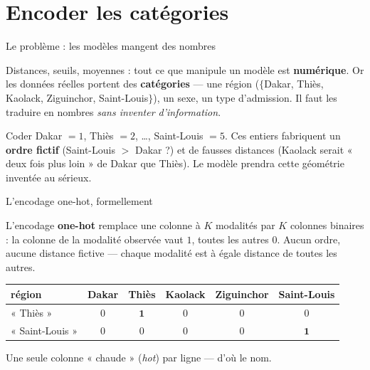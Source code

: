 \documentclass[aspectratio=169,11pt]{beamer}
\begin{document}
\section{Encoder les catégories}

\begin{frame}{Le problème : les modèles mangent des nombres}
\begin{ucaddef}[Le constat]
{\small Distances, seuils, moyennes : tout ce que manipule un modèle est \textbf{numérique}. Or les données réelles portent des \textbf{catégories} — une région ($\{$Dakar, Thiès, Kaolack, Ziguinchor, Saint-Louis$\}$), un sexe, un type d'admission. Il faut les traduire en nombres \emph{sans inventer d'information}.}
\end{ucaddef}
\begin{ucadpiege}
{\small Coder Dakar $=1$, Thiès $=2$, \dots, Saint-Louis $=5$. Ces entiers fabriquent un \textbf{ordre fictif} (Saint-Louis $>$ Dakar ?) et de fausses distances (Kaolack serait « deux fois plus loin » de Dakar que Thiès). Le modèle prendra cette géométrie inventée au sérieux.}
\end{ucadpiege}
\end{frame}

\begin{frame}{L'encodage one-hot, formellement}
\begin{ucaddef}[Définition]
{\small L'encodage \textbf{one-hot} remplace une colonne à $K$ modalités par $K$ colonnes binaires : la colonne de la modalité observée vaut $1$, toutes les autres $0$. Aucun ordre, aucune distance fictive — chaque modalité est à égale distance de toutes les autres.}
\end{ucaddef}
\begin{ucadex}
{\small \begin{center}\begin{tabular}{l|ccccc}
région & Dakar & Thiès & Kaolack & Ziguinchor & Saint-Louis\\\hline
« Thiès » & $0$ & $\mathbf{1}$ & $0$ & $0$ & $0$\\
« Saint-Louis » & $0$ & $0$ & $0$ & $0$ & $\mathbf{1}$\\
\end{tabular}\end{center}
Une seule colonne « chaude » (\emph{hot}) par ligne — d'où le nom.}
\end{ucadex}
\end{frame}
\end{document}
